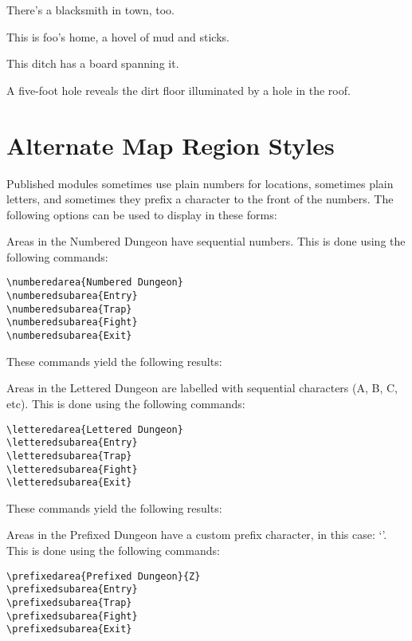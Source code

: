 \documentclass[letterpaper,twocolumn,openany,nodeprecatedcode]{dndbook}
\begin{document}
There's a blacksmith in town, too.

This is foo's home, a hovel of mud and sticks.

This ditch has a board spanning it.

A five-foot hole reveals the dirt floor illuminated by a hole in the roof.

\section{Alternate Map Region Styles}
Published modules sometimes use plain numbers for locations, sometimes plain
letters, and sometimes they prefix a character to the front of the numbers.
The following options can be used to display in these forms:

Areas in the Numbered Dungeon have sequential numbers. This is done using
the following commands:

\begin{verbatim}
\numberedarea{Numbered Dungeon}
\numberedsubarea{Entry}
\numberedsubarea{Trap}
\numberedsubarea{Fight}
\numberedsubarea{Exit}
\end{verbatim}

These commands yield the following results:

Areas in the Lettered Dungeon are labelled with sequential characters
(A, B, C, etc). This is done using the following commands:

\begin{verbatim}
\letteredarea{Lettered Dungeon}
\letteredsubarea{Entry}
\letteredsubarea{Trap}
\letteredsubarea{Fight}
\letteredsubarea{Exit}
\end{verbatim}

These commands yield the following results:

Areas in the Prefixed Dungeon have a custom prefix character,
in this case: `\prefixedareaprefix'.
This is done using the following commands:

\begin{verbatim}
\prefixedarea{Prefixed Dungeon}{Z}
\prefixedsubarea{Entry}
\prefixedsubarea{Trap}
\prefixedsubarea{Fight}
\prefixedsubarea{Exit}
\end{verbatim}
\end{document}
